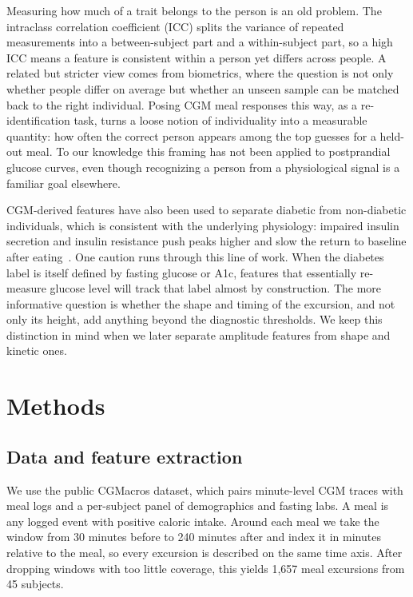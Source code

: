 \documentclass[10pt,conference,compsoc]{IEEEtran}
\begin{document}
Measuring how much of a trait belongs to the person is an old problem. The
intraclass correlation coefficient (ICC) splits the variance of repeated
measurements into a between-subject part and a within-subject part, so a high ICC
means a feature is consistent within a person yet differs across people. A
related but stricter view comes from biometrics, where the question is not only
whether people differ on average but whether an unseen sample can be matched back
to the right individual. Posing CGM meal responses this way, as a
re-identification task, turns a loose notion of individuality into a measurable
quantity: how often the correct person appears among the top guesses for a
held-out meal. To our knowledge this framing has not been applied to postprandial
glucose curves, even though recognizing a person from a physiological signal is a
familiar goal elsewhere.

CGM-derived features have also been used to separate diabetic from non-diabetic
individuals, which is consistent with the underlying physiology: impaired insulin
secretion and insulin resistance push peaks higher and slow the return to
baseline after eating~\cite{defronzo2004}. One caution runs through this line of
work. When the diabetes label is itself defined by fasting glucose or A1c,
features that essentially re-measure glucose level will track that label almost by
construction. The more informative question is whether the shape and timing of the
excursion, and not only its height, add anything beyond the diagnostic
thresholds. We keep this distinction in mind when we later separate amplitude
features from shape and kinetic ones.

\section{Methods}

\subsection{Data and feature extraction}
We use the public CGMacros dataset, which pairs minute-level CGM traces with meal
logs and a per-subject panel of demographics and fasting labs. A meal is any
logged event with positive caloric intake. Around each meal we take the window
from 30 minutes before to 240 minutes after and index it in minutes relative to
the meal, so every excursion is described on the same time axis.
After dropping windows with too little coverage, this yields 1{,}657 meal
excursions from 45 subjects.
\end{document}
